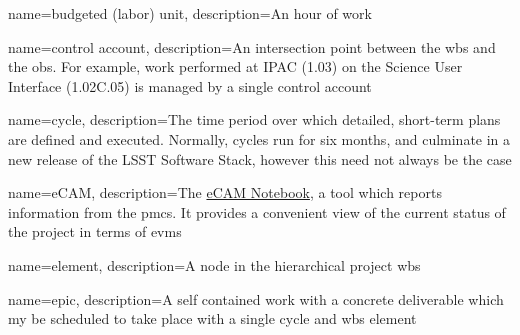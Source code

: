 


{
 name={budgeted (labor) unit},
 description={An hour of work}
}



{
 name={control account},
 description={An intersection point between the \gls{wbs} and the \gls{obs}.
              For example, work performed at IPAC (1.03) on the Science User Interface (1.02C.05) is managed by a single control account}
}



{
 name=cycle,
 description={The time period over which detailed, short-term plans are defined and executed.
              Normally, cycles run for six months, and culminate in a new release of the LSST Software Stack, however this need not always be the case}
}

{
 name=eCAM,
 description={The \href{https://msweb.lsstcorp.org/eCAM/}{eCAM Notebook}, a tool which reports information from the \gls{pmcs}.
              It provides a convenient view of the current status of the project in terms of \gls{evms}}
}

{
 name=element,
 description={A node in the hierarchical project \gls{wbs}}
}

{
 name=epic,
 description={A self contained work with a concrete deliverable which my be scheduled to take place with a single \gls{cycle} and \gls{wbs} \gls{element}}
}

